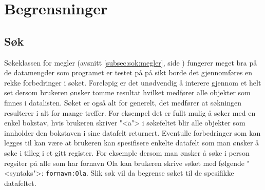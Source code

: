 \section{Begrensninger}

\subsection{Søk} \label{subsec:begrensinger:sok}
Søkeklassen for megler (avsnitt \ref{subsec:sok:megler}, side \pageref{subsec:sok:megler}) fungerer meget bra på de datamengder som programet er testet på på sikt borde det gjennomføres en rekke forbedringer i søket. Foreløpig er det unødvendig å interere gjennom et helt set dersom brukeren ønsker tomme resultat hvilket medfører alle objekter som finnes i datalisten. Søket er også alt for generelt, det medfører at søkningen resulterer i alt for mange treffer. For eksempel det er fullt mulig å søker med en enkel bokstav, hvis brukeren skriver "<a"> i søkefeltet blir alle objekter som innholder den bokstaven i sine datafelt returnert. Eventulle forbedringer som kan legges til kan være at brukeren kan spesifisere enkelte datafelt som man ønsker å søke i tilleg i et gitt register. For eksemple dersom man ønsker å søke i person regsiter på alle som har fornavn Ola kan brukeren skrive søket med følgende "<syntaks">: \texttt{fornavn:Ola}. Slik søk vil da begrense søket til de spesifikke datafeltet.
